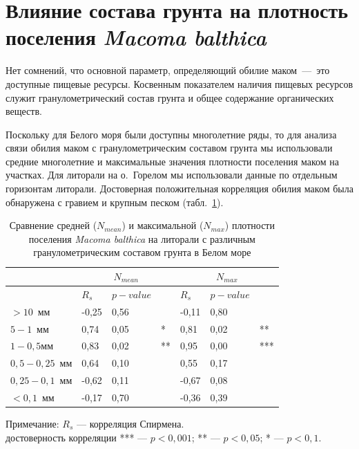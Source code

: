     \section{Влияние состава грунта на плотность поселения {\it Macoma balthica}}
Нет сомнений, что основной параметр, определяющий обилие маком~---\ это доступные пищевые   ресурсы.   
Косвенным   показателем   наличия   пищевых   ресурсов   служит гранулометрический состав грунта и общее содержание органических веществ. 

Поскольку для Белого моря были доступны многолетние ряды, то для анализа связи обилия маком с гранулометрическим составом грунта мы использовали средние многолетние и максимальные значения плотности поселения маком на участках. 
Для литорали на о.~Горелом мы использовали данные по отдельным горизонтам литорали.
Достоверная положительная корреляция обилия маком была обнаружена с гравием и крупным песком (табл.~\ref{tab:grunt_N_correlation_White}).
	\begin{table}[p]
	\begin{center}
		\caption{Сравнение средней ($N_{mean}$) и максимальной ($N_{max}$) плотности поселения {\it Macoma balthica} на литорали с различным гранулометрическим составом грунта в Белом море}
	\label{tab:grunt_N_correlation_White}
	\begin{tabularx}{\textwidth}{|l|XXl|XXl|}
	\hline
	& \multicolumn{3}{c|}{$N_{mean}$} & \multicolumn{3}{c|}{$N_{max}$}\\ \hline
           & $R_s$ & $p-value$ &    & $R_s$ & $p-value$ &     \\ \hline
	$> 10$~мм   & -0,25     & 0,56    &    & -0,11    & 0,80   &     \\ \hline
	$5 - 1$~мм  & 0,74      & 0,05    & *  & 0,81     & 0,02   & **  \\ \hline
	$1 - 0,5$мм  & 0,83      & 0,02    & ** & 0,95     & 0,00   & *** \\ \hline
	$0,5 - 0,25$~мм & 0,64      & 0,10    &    & 0,55     & 0,17   &     \\ \hline
	$0,25 - 0,1$~мм  & -0,62     & 0,11    &    & -0,67    & 0,08   &     \\ \hline
	$< 0,1$~мм  & -0,17     & 0,70    &    & -0,36    & 0,39   &    \\\hline
	\end{tabularx}
	\end{center}
	    {\footnotesize Примечание: $R_s$ --- корреляция Спирмена. \\
	    достоверность корреляции *** --- $p<0,001$; ** --- $p<0,05$; * --- $p<0,1$.}
	\end{table}

